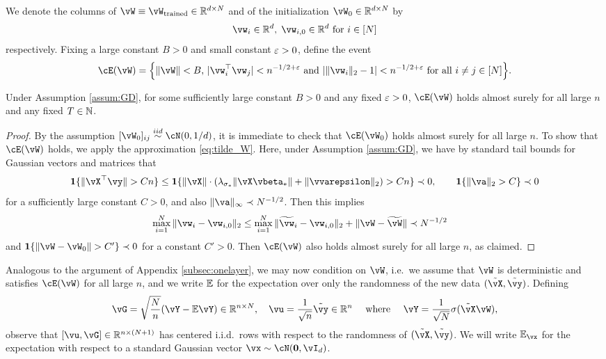 We denote the columns of $\vW \equiv
\vW_{\text{trained}} \in \R^{d \times N}$
and of the initialization $\vW_0 \in \R^{d \times N}$ by
\[\vw_i \in \R^d,\; \vw_{i,0} \in \R^d \text{ for } i \in [N]\]
respectively. Fixing a large constant $B>0$ and small constant $\varepsilon>0$,
define the event
\[\cE(\vW)=\Big\{\|\vW\|<B,\,|\vw_i^\top \vw_j|<n^{-1/2+\eps}
\text{ and } |\|\vw_i\|_2-1|<n^{-1/2+\eps} \text{ for all } i \neq j \in
[N]\Big\}.\]

\begin{lemma}\label{lemma:event_Wt}
Under Assumption \ref{assum:GD}, for some sufficiently large constant
$B>0$ and any fixed $\varepsilon>0$, $\cE(\vW)$ holds almost surely for all large $n$ and any fixed $T\in\mathbb{N}$.
\end{lemma}
\begin{proof}
By the assumption $[\vW_0]_{ij} \overset{iid}{\sim} \cN(0,1/d)$, it is
immediate to check that $\cE(\vW_0)$ holds almost surely for all large $n$.
To show that $\cE(\vW)$ holds, we apply the approximation \eqref{eq:tilde_W}.
Here, under Assumption \ref{assum:GD},
we have by standard tail bounds for Gaussian vectors and matrices that
\[\bI\{\|\vX^\top \vy\|>Cn\}
\leq \bI\{\|\vX\| \cdot (\lambda_{\sigma_*}\|\vX\vbeta_*\|+\|\vvarepsilon\|_2)>Cn\} \prec 0,
\qquad \bI\{\|\va\|_2>C\} \prec 0\]
for a sufficiently large constant $C>0$, and also
$\|\va\|_\infty \prec N^{-1/2}$. Then this implies
\begin{align}
\max_{i=1}^N \|\vw_i-\vw_{i,0}\|_2
&\leq \max_{i=1}^N \|\widetilde \vw_i-\vw_{i,0}\|_2
+\|\vW-\widetilde \vW\| \prec N^{-1/2}\label{eq:W_12_norm}
\end{align}
and $\bI\{\|\vW-\vW_0\|>C'\} \prec 0$ for a constant $C'>0$. Then $\cE(\vW)$
also holds almost surely for all large $n$, as claimed.
\end{proof}

Analogous to the argument of Appendix \ref{subsec:onelayer},
we may now condition on $\vW$, i.e.\ we assume that $\vW$ is deterministic and
satisfies $\cE(\vW)$ for all large $n$, and we
write $\mathbb{E}$ for the expectation
over only the randomness of the new data $(\tilde \vX,\tilde \vy)$.
Defining
\begin{equation}\label{eq:udef}
\vG=\sqrt{\frac{N}{n}}(\vY-\E\vY) \in \R^{n \times N},
\quad \vu=\frac{1}{\sqrt{n}}\tilde\vy \in \R^n
\quad \text{ where } \quad
\vY=\frac{1}{\sqrt{N}}\sigma(\tilde \vX\vW),
\end{equation}
observe that $[\vu,\vG] \in \R^{n \times (N+1)}$ has centered i.i.d.\ rows with
respect to the randomness of $(\tilde \vX,\tilde\vy)$.
We will write $\E_{\vx}$ for the expectation with respect to a standard Gaussian
vector $\vx \sim \cN(\mathbf{0},\vI_d)$.

